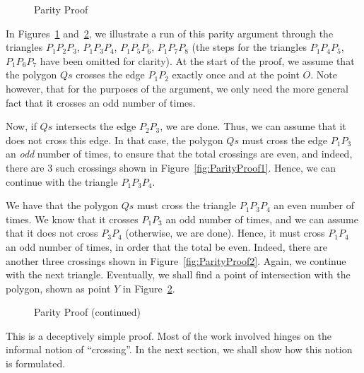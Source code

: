 \begin{figure}
\caption{Parity Proof}
\label{fig:ParityProof}
\end{figure}

In Figures~\ref{fig:ParityProof} and~\ref{fig:ParityProofCont}, we illustrate a run of this parity argument through the triangles $P_1P_2P_3$, $P_1P_3P_4$, $P_1P_5P_6$, $P_1P_7P_8$ (the steps for the triangles $P_1P_4P_5$, $P_1P_6P_7$ have been omitted for clarity). At the start of the proof, we assume that the polygon $Qs$ crosses the edge $P_1P_2$ exactly once and at the point $O$. Note however, that for the purposes of the argument, we only need the more general fact that it crosses an odd number of times. 

Now, if $Qs$ intersects the edge $P_2P_3$, we are done. Thus, we can assume that it does not cross this edge. In that case, the polygon $Qs$ must cross the edge $P_1P_3$ an \emph{odd} number of times, to ensure that the total crossings are even, and indeed, there are 3 such crossings shown in Figure~\ref{fig:ParityProof1}. Hence, we can continue with the triangle $P_1P_3P_4$. 

We have that the polygon $Qs$ must cross the triangle $P_1P_3P_4$ an even number of times. We know that it crosses $P_1P_3$ an odd number of times, and we can assume that it does not cross $P_3P_4$ (otherwise, we are done). Hence, it must cross $P_1P_4$ an odd number of times, in order that the total be even. Indeed, there are another three crossings shown in Figure~\ref{fig:ParityProof2}. Again, we continue with the next triangle. Eventually, we shall find a point of intersection with the polygon, shown as point $Y$ in Figure~\ref{fig:ParityProofCont}.

\begin{figure}
\caption{Parity Proof (continued)}
\label{fig:ParityProofCont}
\end{figure}

This is a deceptively simple proof. Most of the work involved hinges on the informal notion of ``crossing''. In the next section, we shall show how this notion is formulated.

